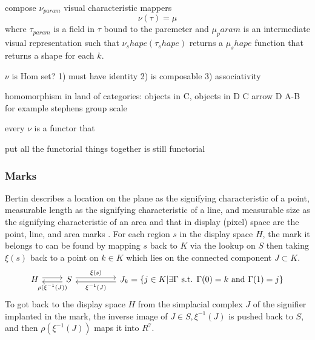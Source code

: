 \documentclass[../main.tex]{subfiles}
\begin{document}
compose $\nu_{param}$ visual characteristic mappers
\begin{equation}
    \nu(\tau) = \mu
\end{equation}
where $\tau_{param}$ is a field in $\tau$ bound to the paremeter and $\mu_param$ is an intermediate visual representation such that $\nu_shape(\tau_shape)$ returns a $\mu_shape$ function that returns a shape for each $k$.


$\nu$ is Hom set? 
1) must have identity
2) is composable
3) associativity 

homomorphism in land of categories:
objects in C, objects in D
C arrow D
 A-B for example stephens group scale

every $\nu$ is a functor that

put all the functorial things together is still functorial 


\subsubsection{Marks}
Bertin describes a location on the plane as the signifying characteristic of a point, measurable length as the signifying characteristic of a line, and measurable size as the signifying characteristic of an area and that in display (pixel) space are the point, line, and area marks \cite{bertinIIPropertiesGraphic2011,carpendaleVisualRepresentationSemiology}. For each region $s$ in the display space $H$, the mark it belongs to can be found by mapping $s$ back to $K$ via the lookup on $S$ then taking $\xi(s)$ back to a point on $k \in K$ which lies on the connected component $J \subset K$. 
\begin{equation}
\begin{tikzcd}
    H \arrow[r, shift left] & S \arrow[l, "\rho(\xi^{-1}(J))", shift left] \arrow[rr, "\xi(s)", shift left] &  & J_{k} =  \{j \in K| \exists \Gamma \text{ s.t. } \Gamma(0)=k \text{ and }\Gamma(1)=j\} \arrow[ll, "\xi^{-1}(J)", shift left]
\end{tikzcd}
\label{eq:mark}
\end{equation}
To got back to the display space $H$  from the simplacial complex $J$ of the signifier implanted in the mark, the inverse image of $J \in S, \xi^{-1}(J)$ is pushed back to $S$, and then  $\rho(\xi^{-1}(J))$ maps it into $R^{7}$. 
\end{document}
